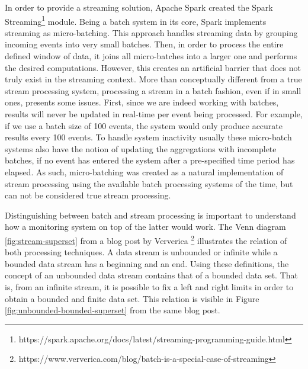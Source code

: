 In order to provide a streaming solution, Apache Spark created the Spark Streaming\footnote{https://spark.apache.org/docs/latest/streaming-programming-guide.html} module. Being a batch system in its core, Spark implements streaming as micro-batching. This approach handles streaming data by grouping incoming events into very small batches. Then, in order to process the entire defined window of data, it joins all micro-batches into a larger one and performs the desired computations. However, this creates an artificial barrier that does not truly exist in the streaming context. More than conceptually different from a true stream processing system, processing a stream in a batch fashion, even if in small ones, presents some issues. First, since we are indeed working with batches, results will never be updated in real-time per event being processed. For example, if we use a batch size of 100 events, the system would only produce accurate results every 100 events. To handle system inactivity usually these micro-batch systems also have the notion of updating the aggregations with incomplete batches, if no event has entered the system after a pre-specified time period has elapsed. As such, micro-batching was created as a natural implementation of stream processing using the available batch processing systems of the time, but can not be considered true stream processing.

Distinguishing between batch and stream processing is important to understand how a monitoring system on top of the latter would work. The Venn diagram \ref{fig:stream-superset} from a blog post by Ververica \footnote{https://www.ververica.com/blog/batch-is-a-special-case-of-streaming} illustrates the relation of both processing techniques. A data stream is unbounded or infinite while a bounded data stream has a beginning and an end. Using these definitions, the concept of an unbounded data stream contains that of a bounded data set. That is, from an infinite stream, it is possible to fix a left and right limits in order to obtain a bounded and finite data set. This relation is visible in Figure \ref{fig:unbounded-bounded-superset} from the same blog post.

